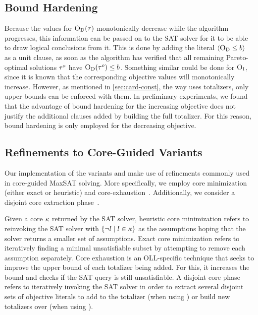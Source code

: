 \subsection{Bound Hardening}

Because the values for $\textsc{O}_{\text{D}}(\tau)$ monotonically decrease while the algorithm progresses, this information can be passed on to the SAT solver for it to be able to draw logical conclusions from it.
This is done by adding the literal $\langle \textsc{O}_{\text{D}} \leq b \rangle$ as a unit clause, as soon as the algorithm has verified that all remaining Pareto-optimal solutions $\tau^o$ have $\textsc{O}_{\text{D}}(\tau^o)\le b$.
Something similar could be done for $\textsc{O}_{\text{I}}$, since it is known that the corresponding objective values will monotonically increase.
However, as mentioned in \cref{sec:card-const}, the way \algname{} uses totalizers, only upper bounds can be enforced with them.
In preliminary experiments, we found that the advantage of bound hardening for the increasing objective does not justify the additional clauses added by building the full totalizer.
For this reason, bound hardening is only employed for the decreasing objective.

\subsection{Refinements to Core-Guided Variants}

Our implementation of the \algname{} variants \msu{} and \oll{} make use of refinements commonly used in core-guided MaxSAT solving.
More specifically, we employ core minimization~\autocite{DBLP:journals/jsat/IgnatievMM19} (either exact or heuristic) and core-exhaustion~\autocites{DBLP:journals/jsat/IgnatievMM19,DBLP:conf/cp/AnsoteguiBGL13}.
Additionally, we consider a disjoint core extraction phase~\autocite{DBLP:conf/cp/DaviesB11}.

Given a core $\kappa$ returned by the SAT solver, heuristic core minimization refers to reinvoking the SAT solver with $\{\lnot l \mid l \in \kappa\}$ as the assumptions hoping that the solver returns a smaller set of assumptions.
Exact core minimization refers to iteratively finding a minimal unsatisfiable subset by attempting to remove each assumption separately.
Core exhaustion is an OLL-specific technique that seeks to improve the upper bound of each totalizer being added.
For this, it increases the bound and checks if the SAT query is still unsatisfiable.
A disjoint core phase refers to iteratively invoking the SAT solver in order to extract several disjoint sets of objective literals to add to the totalizer (when using \msu{}) or build new totalizers over (when using \oll{}).